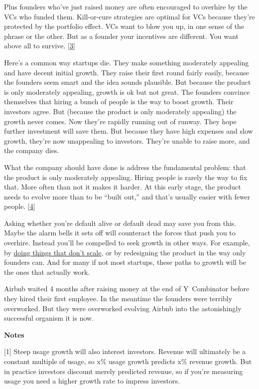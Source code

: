 Plus founders who've just raised money are often encouraged to overhire
by the VCs who funded them. Kill-or-cure strategies are optimal for VCs
because they're protected by the portfolio effect. VCs want to blow you
up, in one sense of the phrase or the other. But as a founder your
incentives are different. You want above all to survive.
{[}\hyperref[f3n]{3}{]}

Here's a common way startups die. They make something moderately
appealing and have decent initial growth. They raise their first round
fairly easily, because the founders seem smart and the idea sounds
plausible. But because the product is only moderately appealing, growth
is ok but not great. The founders convince themselves that hiring a
bunch of people is the way to boost growth. Their investors agree. But
(because the product is only moderately appealing) the growth never
comes. Now they're rapidly running out of runway. They hope further
investment will save them. But because they have high expenses and slow
growth, they're now unappealing to investors. They're unable to raise
more, and the company dies.

What the company should have done is address the fundamental problem:
that the product is only moderately appealing. Hiring people is rarely
the way to fix that. More often than not it makes it harder. At this
early stage, the product needs to evolve more than to be ``built out,''
and that's usually easier with fewer people. {[}\hyperref[f4n]{4}{]}

Asking whether you're default alive or default dead may save you from
this. Maybe the alarm bells it sets off will counteract the forces that
push you to overhire. Instead you'll be compelled to seek growth in
other ways. For example, by \href{ds.html}{doing things that don't
scale}, or by redesigning the product in the way only founders can. And
for many if not most startups, these paths to growth will be the ones
that actually work.

Airbnb waited 4 months after raising money at the end of Y~Combinator
before they hired their first employee. In the meantime the founders
were terribly overworked. But they were overworked evolving Airbnb into
the astonishingly successful organism it is now.

\textbf{Notes}

{[}1{]} Steep usage growth will also interest investors. Revenue will
ultimately be a constant multiple of usage, so x\% usage growth predicts
x\% revenue growth. But in practice investors discount merely predicted
revenue, so if you're measuring usage you need a higher growth rate to
impress investors.

